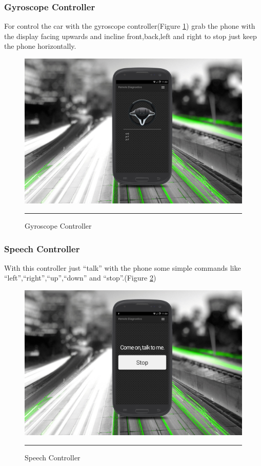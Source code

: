 \subsubsection{Gyroscope Controller}
For control the car with the gyroscope controller(Figure \ref{fig:gyroscope_controller}) grab the phone with the display facing upwards and incline front,back,left and right to stop just keep the phone horizontally. 
\begin{figure}[h!]
  \centering
    \includegraphics[width=1\textwidth]{./Pictures/gyroscope_controller.jpg}
  \rule{1\textwidth}{1pt}
 \caption{Gyroscope Controller}
  \label{fig:gyroscope_controller}
\end{figure}

\subsubsection{Speech Controller}
With this controller just ``talk''  with the phone some simple commands like ``left'',``right'',``up'',``down'' and ``stop''.(Figure \ref{fig:speech_controller})

\begin{figure}[h!]
  \centering
    \includegraphics[width=1\textwidth]{./Pictures/speech_controller.jpg}
  \rule{1\textwidth}{1pt}
 \caption{Speech Controller}
  \label{fig:speech_controller}
\end{figure}


